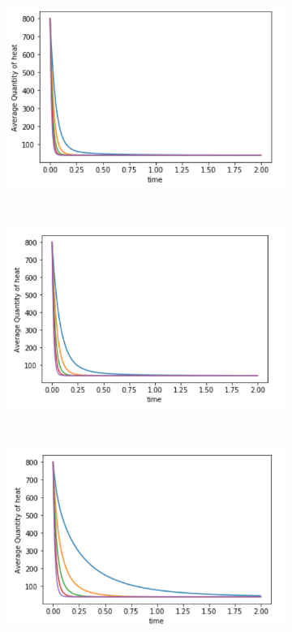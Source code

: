 \documentclass[10pt,a4paper]{article}
\begin{document}
     \begin{figure}[H]
     	\centering
     	\begin{subfigure}[b]{0.45\textwidth}
     		\includegraphics[width= \textwidth]{images/Barabasi-highest-degree.png}
     		\caption{}
     		\label{}
     	\end{subfigure}~
     	\begin{subfigure}[b]{0.45\textwidth}
     		\includegraphics[width= \textwidth]{images/E-R-largest.png}
     		\caption{}
     		\label{}
     	\end{subfigure}\\
     	\begin{subfigure}[b]{0.45\textwidth}
     		\includegraphics[width= \textwidth]{images/barabasi-random-selection.png}

\end{subfigure}
\end{figure}
\end{document}

